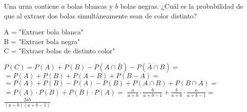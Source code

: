 \problem
Una urna contiene $ a $ bolas blancas y $ b $ bolas negras. ¿Cuál es la
probabilidad de que al extraer dos bolas simultáneamente sean de
color distinto?

\begin{flushleft}
	A = "Extraer bola blanca" \\
B = "Extraer bola negra" \\
C = "Extraer bolas de distinto color"
\end{flushleft}

\begin{flushleft}
	$P(C) = P(A) + P(B)-P(A\cap \bar{B}) -P( \bar{A} \cap B ) =$\\$= P(A) + P(B) + P(A - B) + P(B - A) = $\\
$	= P(A) + P(B) - P(A) - P(B) + P(A\cap B) + P(B\cap A)=$\\
$ 	=P(A) \cdot P(B) + P(B) \cdot P(A) = $
$ \frac{a}{a+b} \cdot \frac{b}{a+b-1} + \frac{b}{a+b} \cdot \frac{a}{a+b-1}= $
$\frac{2ab}{(a+b)(a+b-1)}$
\end{flushleft}
